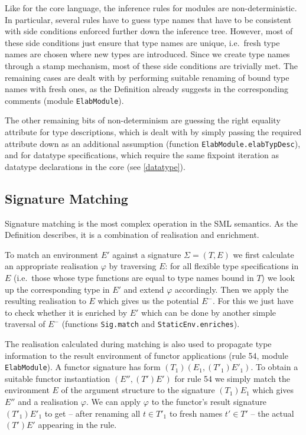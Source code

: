 \documentclass[twoside,titlepage]{article}
\begin{document}
Like for the core language, the inference rules for modules are non-deterministic. In particular, several rules have to guess type names that have to be consistent with side conditions enforced further down the inference tree. However, most of these side conditions just ensure that type names are unique, i.e.\ fresh type names are chosen where new types are introduced. Since we create type names through a stamp mechanism, most of these side conditions are trivially met. The remaining cases are dealt with by performing suitable renaming of bound type names with fresh ones, as the Definition already suggests in the corresponding comments (module {\tt ElabModule}).

The other remaining bits of non-determinism are guessing the right equality attribute for type descriptions, which is dealt with by simply passing the required attribute down as an additional assumption (function {\tt ElabModule.elabTypDesc}), and for datatype specifications, which require the same fixpoint iteration as datatype declarations in the core (see \ref{datatype}).


\subsection{Signature Matching}
\label{matching}

Signature matching is the most complex operation in the SML semantics. As the Definition describes, it is a combination of realisation and enrichment.

To match an environment $E'$ against a signature $\Sigma = (T,E)$ we first calculate an appropriate realisation $\varphi$ by traversing $E$: for all flexible type specifications in $E$ (i.e.\ those whose type functions are equal to type names bound in $T$) we look up the corresponding type in $E'$ and extend $\varphi$ accordingly. Then we apply the resulting realisation to $E$ which gives us the potential $E^-$. For this we just have to check whether it is enriched by $E'$ which can be done by another simple traversal of $E^-$ (functions {\tt Sig.match} and {\tt StaticEnv.enriches}).

The realisation calculated during matching is also used to propagate type information to the result environment of functor applications (rule 54, module {\tt ElabModule}). A functor signature has form $(T_1)(E_1,(T'_1)E'_1)$. To obtain a suitable functor instantiation $(E'',(T')E')$ for rule 54 we simply match the environment $E$ of the argument structure to the signature $(T_1)E_1$ which gives $E''$ and a realisation $\varphi$. We can apply $\varphi$ to the functor's result signature $(T'_1)E'_1$ to get -- after renaming all $t \in T'_1$ to fresh names $t' \in T'$ -- the actual $(T')E'$ appearing in the rule.
\end{document}
